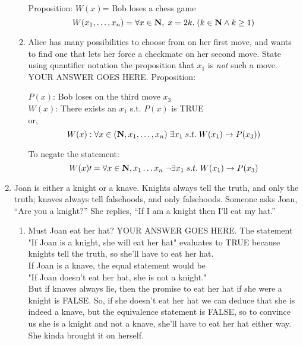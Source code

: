 \documentclass{article}
\begin{document}
\begin{enumerate}
\begin{enumerate}
Proposition:
$W(x)$= Bob loses a chess game \\
\[ W(x_1, \dots, x_n) = \forall x \in \mbox{{\bfseries N}} , \; x=2k . \; (k \in \mbox{{\bfseries N}} \wedge k \ge 1) \]


\item Alice has many possibilities to choose from on her first move,
and wants to find one that lets her force a checkmate on her second move.
State using quantifier notation the proposition that $x_1$
is \emph{not} such a move.
\newline \newline
YOUR ANSWER GOES HERE.
\newline \newline
Proposition: 

$P(x)$: Bob loses on the third move $x_3$ \\
$W(x)$: There exists an $x_1$ s.t. $P(x)$ is TRUE \\
or,
\[ W(x): \forall x \in (\mbox{{\bfseries N}},  x_1, \dots, x_n) \; \exists x_1 \; s.t. \; W(x_1) \to P(x_3)) \]

To negate the statement:
\[ W(x)\prime = \forall x \in \mbox{{\bfseries N}}, x_1 \dots x_n \; \neg \exists x_1 \; s.t. \; W(x_1) \to P(x_3) \]
\end{enumerate}
\newpage

\item
Joan is either a knight or a knave.
Knights always tell the truth, and only the truth;
knaves always tell falsehoods, and only falsehoods.
Someone asks Joan, ``Are you a knight?''  She replies,
``If I am a knight then I'll eat my hat.''
\begin{enumerate}
\item Must Joan eat her hat?
\newline \newline
YOUR ANSWER GOES HERE.
\newline \newline
The statement 
"If Joan is a knight, she will eat her hat" evaluates to TRUE because knights tell the truth, so she'll have to eat her hat.\\

If Joan is a knave, the equal statement would be \\
"If Joan doesn't eat her hat, she is not a knight." \\
But if knaves always lie, then the promise to eat her hat if she were a knight is FALSE. So, if she doesn't eat her hat we can deduce that she is indeed a knave, but the equivalence statement is FALSE, so to convince us she is a knight and not a knave, she'll have to eat her hat either way.
She kinda brought it on herself.


\end{enumerate}
\end{enumerate}
\end{document}

